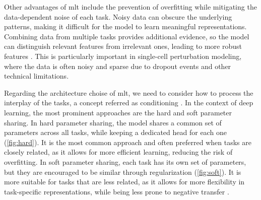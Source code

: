 \documentclass[12pt, a4paper]{article}
\begin{document}
Other advantages of \gls{mlt} include the prevention of overfitting while mitigating the data-dependent noise of each task. Noisy data can obscure the underlying patterns, making it difficult for the model to learn meaningful representations. Combining data from multiple tasks provides additional evidence, so the model can distinguish relevant features from irrelevant ones, leading to more robust features \cite{ruderOverviewMultiTaskLearning2017}. This is particularly important in single-cell perturbation modeling, where the data is often noisy and sparse due to dropout events and other technical limitations. 

Regarding the architecture choise of \gls{mlt}, we need to consider how to process the interplay of the tasks, a concept referred as conditioning \cite{dumoulin2018feature-wise}. In the context of deep learning, the most prominent approaches are the hard and soft parameter sharing. In hard parameter sharing, the model shares a common set of parameters across all tasks, while keeping a dedicated head for each one (\cref{fig:hard}). It is the most common approach and often preferred when tasks are closely related, as it allows for more efficient learning, reducing the risk of overfitting. In soft parameter sharing, each task has its own set of parameters, but they are encouraged to be similar through regularization (\cref{fig:soft}). It is more suitable for tasks that are less related, as it allows for more flexibility in task-specific representations, while being less prone to negative transfer \cite{ruderOverviewMultiTaskLearning2017}.
\end{document}
